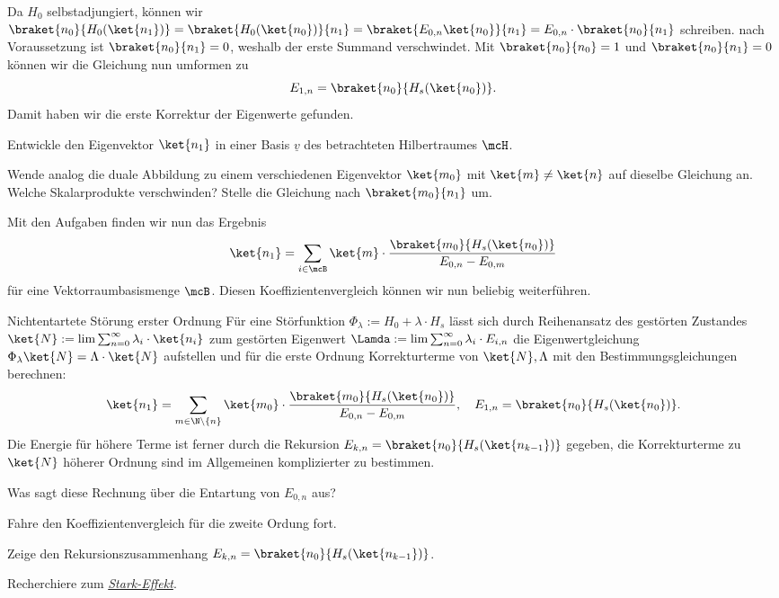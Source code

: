 \documentclass{subfile}
\begin{document}
            Da $H_0$ selbstadjungiert, können wir $\braket{n_0}{H_0(\ket{n_1})} = \braket{H_0(\ket{n_0})}{n_1} = \braket{E_{0,n}\ket{n_0}}{n_1} = E_{0,n}\cdot\braket{n_0}{n_1}$ schreiben. nach Voraussetzung ist $\braket{n_0}{n_1} = 0$, weshalb der erste Summand verschwindet. Mit $\braket{n_0}{n_0} = 1$ und $\braket{n_0}{n_1} = 0$ können wir die Gleichung nun umformen zu
            \[
                E_{1,n} = \braket{n_0}{H_s(\ket{n_0})}.
            \]
            Damit haben wir die erste Korrektur der Eigenwerte gefunden. 
            \begin{Aufgabe}
                \nr{} Entwickle den Eigenvektor $\ket{n_1}$ in einer Basis $\underline v$ des betrachteten Hilbertraumes $\mcH$. 

                \nr{} Wende analog die duale Abbildung zu einem verschiedenen Eigenvektor $\ket{m_0}$ mit $\ket{m}\neq\ket{n}$ auf dieselbe Gleichung an. Welche Skalarprodukte verschwinden? Stelle die Gleichung nach $\braket{m_0}{n_1}$ um. 
            \end{Aufgabe}
            \noindent Mit den Aufgaben finden wir nun das Ergebnis
            \[
                \ket{n_1} = \sum_{i\in\mcB}\ket{m}\cdot \frac{\braket{m_0}{H_s(\ket{n_0})}}{E_{0,n} - E_{0,m}}
            \]
            für eine Vektorraumbasismenge $\mcB$. 
            Diesen Koeffizientenvergleich können wir nun beliebig weiterführen. 
            \begin{mcor}{Nichtentartete Störung erster Ordnung}
                Für eine Störfunktion $\Phi_\lambda := H_0 + \lambda\cdot H_s$ lässt sich durch Reihenansatz des gestörten Zustandes $\ket{N}:=\lim\sum_{n=0}^\infty\lambda_i\cdot\ket{n_i}$ zum gestörten Eigenwert $\Lamda:=\lim\sum_{n=0}^\infty\lambda_i\cdot E_{i,n}$ die Eigenwertgleichung $\Phi_\lambda\ket{N} = \Lambda\cdot\ket{N}$ aufstellen und für die erste Ordnung Korrekturterme von $\ket{N},\Lambda$ mit den Bestimmungsgleichungen berechnen:
                \[
                    \ket{n_1} = \sum_{m\in\N\setminus\{n\}}\ket{m_0}\cdot\frac{\braket{m_0}{H_s(\ket{n_0})}}{E_{0,n} - E_{0,m}},\quad E_{1,n} = \braket{n_0}{H_s(\ket{n_0})}.
                \]
                Die Energie für höhere Terme ist ferner durch die Rekursion $E_{k,n} = \braket{n_0}{H_s(\ket{n_{k-1}})}$ gegeben, die Korrekturterme zu $\ket{N}$ höherer Ordnung sind im Allgemeinen komplizierter zu bestimmen. 
            \end{mcor}
            \begin{Aufgabe}
                \nr{} Was sagt diese Rechnung über die Entartung von $E_{0,n}$ aus?

                \nr{} Fahre den Koeffizientenvergleich für die zweite Ordung fort. 

                \nr{} Zeige den Rekursionszusammenhang $E_{k,n} = \braket{n_0}{H_s(\ket{n_{k-1}})}$. 

                \nr{} Recherchiere zum \href{https://de.wikipedia.org/wiki/Stark-Effekt}{\emph{Stark-Effekt}}.
            \end{Aufgabe}

            
            
\end{document}
